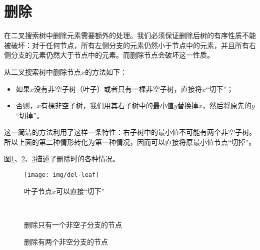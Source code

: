 \documentclass[b5paper]{ctexart}
\begin{document}
\section{删除}
在二叉搜索树中删除元素需要额外的处理。我们必须保证删除后树的有序性质不能被破坏：对于任何节点，所有左侧分支的元素仍然小于节点中的元素，并且所有右侧分支的元素仍然大于节点中的元素。而删除节点会破坏这一性质。

从二叉搜索树中删除节点$x$的方法如下\cite{sgi-stl}：
\begin{itemize}
\item 如果$x$没有非空子树（叶子）或者只有一棵非空子树，直接将$x$“切下”；
\item 否则，$x$有棵非空子树，我们用其右子树中的最小值$y$替换掉$x$，然后将原先的$y$“切掉”。
\end{itemize}

这一简洁的方法利用了这样一条特性：右子树中的最小值不可能有两个非空子树。所以上面的第二种情形转化为第一种情况，因而可以直接将原最小值节点“切掉”。

图\ref{fig:del-leaf}、\ref{fig:del-1child}、\ref{fig:del-branch}描述了删除时的各种情况。

\begin{figure}[htbp]
  \centering
  \texttt{[image: img/del-leaf]}
  \caption{叶子节点$x$可以直接“切下”} \label{fig:del-leaf}
\end{figure}

\begin{figure}[htbp]
  \centering
   \\
  \caption{删除只有一个非空子分支的节点}
  \label{fig:del-1child}
\end{figure}

\begin{figure}[htbp]
  \centering
  \caption{删除有两个非空分支的节点}
  \label{fig:del-branch}
\end{figure}
\end{document}
